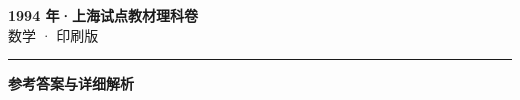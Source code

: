 \documentclass[zihao=5, a4paper]{ctexart}
\begin{document}
\begin{center}
  {\Large\bfseries 1994 年·上海试点教材理科卷}\\[4pt]
  {\large 数学 · 印刷版}
\end{center}
\medskip
{}

\par\bigskip\hrule\bigskip
{}
\begin{center}{\large\bfseries 参考答案与详细解析}\end{center}
\smallskip

\end{document}

